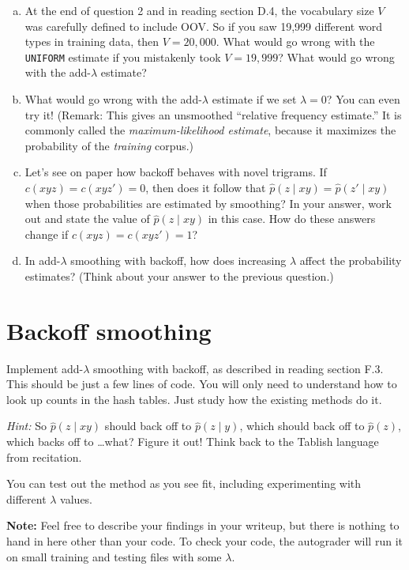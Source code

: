 \documentclass[12pt]{article}
\theoremstyle{plain}
\theoremstyle{definition}
\theoremstyle{remark}
\begin{document}
\begin{enumerate}[(a)]
\item At the end of question 2 and in reading section D.4, the vocabulary size $V$ was carefully defined to include OOV. So if you saw 19,999 different word types in training data, then $V=20{,}000$. What would go wrong with the \texttt{UNIFORM} estimate if you mistakenly took $V=19{,}999$? What would go wrong with the add-$\lambda$ estimate?

\item What would go wrong with the add-$\lambda$ estimate if we set $\lambda = 0$? You can even try it! (Remark: This gives an unsmoothed “relative frequency estimate.” It is commonly called the \textit{maximum-likelihood estimate}, because it maximizes the probability of the \textit{training} corpus.)

\item Let’s see on paper how backoff behaves with novel trigrams. If $c(xyz) = c(xyz') = 0$, then does it follow that $\hat{p}(z \mid xy) = \hat{p}(z' \mid xy)$ when those probabilities are estimated by smoothing? In your answer, work out and state the value of $\hat{p}(z \mid xy)$ in this case. How do these answers change if $c(xyz) = c(xyz') = 1$?

\item In add-$\lambda$ smoothing with backoff, how does increasing $\lambda$ affect the probability estimates? (Think about your answer to the previous question.)
\end{enumerate}

\section{Backoff smoothing}

Implement add-$\lambda$ smoothing with backoff, as described in reading section F.3. This should be just a few lines of code. You will only need to understand how to look up counts in the hash tables. Just study how the existing methods do it.

\textit{Hint:} So $\hat{p}(z \mid xy)$ should back off to $\hat{p}(z \mid y)$, which should back off to $\hat{p}(z)$, which backs off to \ldots what? Figure it out! Think back to the Tablish language from recitation.

You can test out the method as you see fit, including experimenting with different $\lambda$ values.

\textbf{Note:} Feel free to describe your findings in your writeup, but there is nothing to hand in here other than your code. To check your code, the autograder will run it on small training and testing files with some $\lambda$.
\end{document}
